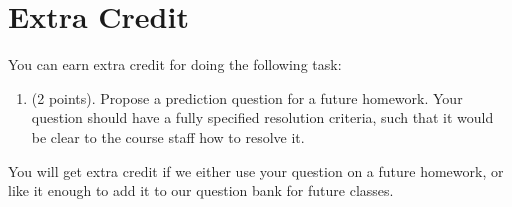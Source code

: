 \documentclass[11pt]{article}
\begin{document}
\section*{Extra Credit}

You can earn extra credit for doing the following task:
\begin{enumerate}
\item (2 points). Propose a prediction question for a future homework. Your question should have a fully specified resolution criteria, 
      such that it would be clear to the course staff how to resolve it.
\end{enumerate}

You will get extra credit if we either use your question on a future homework, 
or like it enough to add it to our question bank for future classes.
\end{document}
